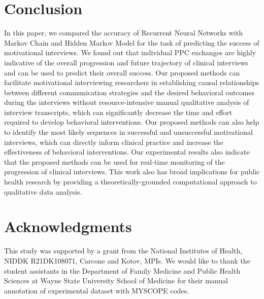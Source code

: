 \documentclass{amia_summit_2018}
\begin{document}
\section*{Conclusion}
In this paper, we compared the accuracy of Recurrent Neural Networks with Markov Chain and Hidden Markov Model for the task of predicting the success of motivational interviews. We found out that individual PPC exchanges are highly indicative of the overall progression and future trajectory of clinical interviews and can be used to predict their overall success. Our proposed methods can facilitate motivational interviewing researchers in establishing causal relationships between different communication strategies and the desired behavioral outcomes during the interviews without resource-intensive manual qualitative analysis of interview transcripts, which can significantly decrease the time and effort required to develop behavioral interventions. Our proposed methods can also help to identify the most likely sequences in successful and unsuccessful motivational interviews, which can directly inform clinical practice and increase the effectiveness of behavioral interventions. Our experimental results also indicate that the proposed methods can be used for real-time monitoring of the progression of clinical interviews. This work also has broad implications for public health research by providing a theoretically-grounded computational approach to qualitative data analysis.

\section*{Acknowledgments}
This study was supported by a grant from the National Institutes of Health, NIDDK R21DK108071, Carcone and Kotov, MPIs. We would like to thank the student assistants in the Department of Family Medicine and Public Health Sciences at Wayne State University School of Medicine for their manual annotation of experimental dataset with MYSCOPE codes. 




\end{document}
